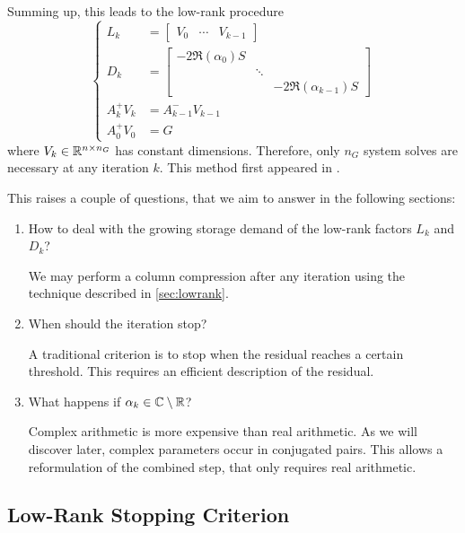 Summing up,
this leads to the low-rank procedure
\begin{equation}
\label{eq:adi:si-lr-adi}
\left\{
\begin{aligned}
  L_k &= \begin{bmatrix}
    V_0 &
    \cdots &
    V_{k-1}
  \end{bmatrix} \\
  D_k &= \begin{bmatrix}
    -2 \Re(\alpha_0) S \\
    & \ddots \\
    && -2 \Re(\alpha_{k-1}) S
  \end{bmatrix} \\
  A_k^+ V_k &= A_{k-1}^- V_{k-1} \\
  A_0^+ V_0 &= G
\end{aligned}
\right.
\end{equation}
where $V_k \in\mathbb{R}^{n\times n_G}$ has constant dimensions.
Therefore, only $n_G$ system solves are necessary at any iteration $k$.
This method first appeared in \cite[Section~5]{Benner2009}.

This raises a couple of questions,
that we aim to answer in the following sections:
\begin{enumerate}
  \item
    How to deal with the growing storage demand of the low-rank factors $L_k$ and $D_k$?

    We may perform a column compression after any iteration using the technique described in \autoref{sec:lowrank}.
  \item
    When should the iteration stop?

    A traditional criterion is to stop when the residual reaches a certain threshold.
    This requires an efficient description of the residual.
  \item
    What happens if $\alpha_k\in\mathbb{C}\setminus\mathbb{R}$?

    Complex arithmetic is more expensive than real arithmetic.
    As we will discover later, complex parameters occur in conjugated pairs.
    This allows a reformulation of the combined step,
    that only requires real arithmetic.
\end{enumerate}

\subsection{Low-Rank Stopping Criterion}
\label{sec:adi:lrstop}

